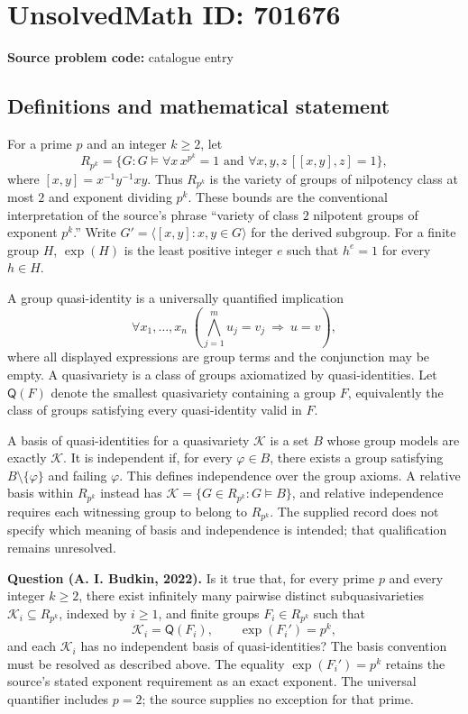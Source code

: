\documentclass[11pt]{article}
\begin{document}
\section*{UnsolvedMath ID: 701676}
\textbf{Source problem code:} catalogue entry
\subsection{Definitions and mathematical statement}
For a prime \(p\) and an integer \(k\geq 2\), let
\[
R_{p^k}=\{G: G\models \forall x\,x^{p^k}=1\text{ and }\forall x,y,z\,[[x,y],z]=1\},
\]
where \([x,y]=x^{-1}y^{-1}xy\). Thus \(R_{p^k}\) is the variety of groups of nilpotency class at most \(2\) and exponent dividing \(p^k\). These bounds are the conventional interpretation of the source's phrase ``variety of class \(2\) nilpotent groups of exponent \(p^k\).'' Write \(G' = \langle [x,y]:x,y\in G\rangle\) for the derived subgroup. For a finite group \(H\), \(\exp(H)\) is the least positive integer \(e\) such that \(h^e=1\) for every \(h\in H\).

A group quasi-identity is a universally quantified implication
\[
\forall x_1,\ldots,x_n\;\left(\bigwedge_{j=1}^{m}u_j=v_j\ \Longrightarrow\ u=v\right),
\]
where all displayed expressions are group terms and the conjunction may be empty. A quasivariety is a class of groups axiomatized by quasi-identities. Let \(\mathsf Q(F)\) denote the smallest quasivariety containing a group \(F\), equivalently the class of groups satisfying every quasi-identity valid in \(F\).

A basis of quasi-identities for a quasivariety \(\mathcal K\) is a set \(B\) whose group models are exactly \(\mathcal K\). It is independent if, for every \(\varphi\in B\), there exists a group satisfying \(B\setminus\{\varphi\}\) and failing \(\varphi\). This defines independence over the group axioms. A relative basis within \(R_{p^k}\) instead has \(\mathcal K=\{G\in R_{p^k}:G\models B\}\), and relative independence requires each witnessing group to belong to \(R_{p^k}\). The supplied record does not specify which meaning of basis and independence is intended; that qualification remains unresolved.

\textbf{Question (A. I. Budkin, 2022).} Is it true that, for every prime \(p\) and every integer \(k\geq 2\), there exist infinitely many pairwise distinct subquasivarieties \(\mathcal K_i\subseteq R_{p^k}\), indexed by \(i\geq 1\), and finite groups \(F_i\in R_{p^k}\) such that
\[
\mathcal K_i=\mathsf Q(F_i),\qquad \exp(F_i')=p^k,
\]
and each \(\mathcal K_i\) has no independent basis of quasi-identities? The basis convention must be resolved as described above. The equality \(\exp(F_i')=p^k\) retains the source's stated exponent requirement as an exact exponent. The universal quantifier includes \(p=2\); the source supplies no exception for that prime.
\end{document}

